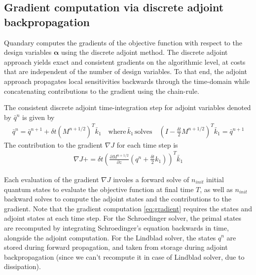 \documentclass[11pt]{article}
\begin{document}

  
  \subsection{Gradient computation via discrete adjoint backpropagation}
   Quandary computes the gradients of the objective function with respect to the design variables $\boldsymbol{\alpha}$ using the discrete adjoint method. The discrete adjoint approach yields exact and consistent gradients on the algorithmic level, at costs that are independent of the number of design variables.    
   To that end, the adjoint approach propagates local sensitivities backwards through the time-domain while concatenating contributions to the gradient using the chain-rule.

  The consistent discrete adjoint time-integration step for
    adjoint variables denoted by $\bar q^{n}$ is given by
   \begin{align}
      \bar q^{n} = \bar q^{n+1} + \delta t \left(M^{n+1/2}\right)^T \bar k_1
      \quad \text{where} \, \bar k_1 \, \text{solves} \quad \left(
      I-\frac{\delta t}{2} M^{n+1/2}\right)^T  \bar k_1 = \bar q^{n+1} 
    \end{align}
  The contribution to the gradient $\nabla J$ for each time step is
    \begin{align}\label{eq:gradient}
      \nabla J += \delta t \left( \frac{\partial M^{n+1/2}}{\partial z}
      \left(q^n + \frac{\delta t}{2} k_1\right) \right)^T\bar k_1
    \end{align}
  
    Each evaluation of the gradient $\nabla J$ involes a forward solve of $n_{init}$ initial quantum states to evaluate the objective function at final time $T$, as well as $n_{init}$ backward solves to compute the adjoint states and the contributions to the gradient. Note that the gradient computation \eqref{eq:gradient} requires the states and adjoint states at each time step. For the Schroedinger solver, the primal states are recomputed by integrating Schroedinger's equation backwards in time, alongside the adjoint computation. For the Lindblad solver, the states $q^n$ are stored during forward propagation, and taken from storage during adjoint backpropagation (since we can't recompute it in case of Lindblad solver, due to dissipation). 
\end{document}
